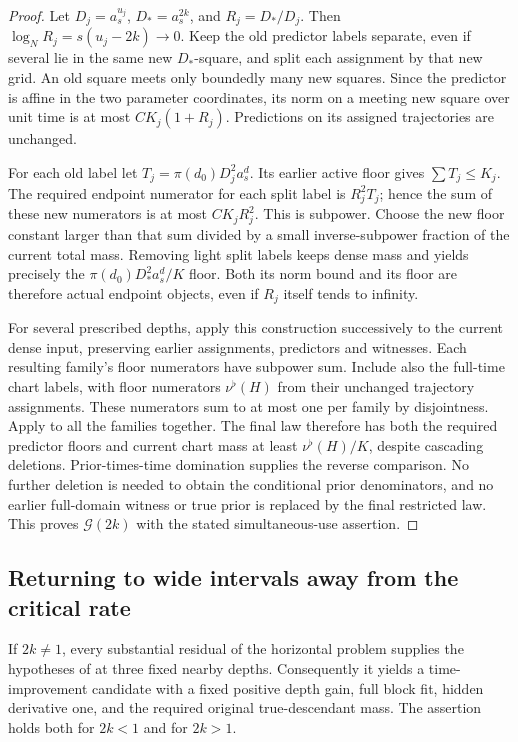 \begin{proof}
Let \(D_j=a_s^{u_j}\), \(D_*=a_s^{2k}\), and
\(R_j=D_*/D_j\).  Then
\(\log_N R_j=s(u_j-2k)\to0\).  Keep the old predictor labels
separate, even if several lie in the same new \(D_*\)-square,
and split each assignment by that new grid.  An old square meets
only boundedly many new squares.  Since the predictor is affine
in the two parameter coordinates, its norm on a meeting new square
over unit time is at most
\(C K_j(1+R_j)\).  Predictions on its assigned trajectories
are unchanged.

For each old label let
\(T_j=\pi(d_0)D_j^2a_s^d\).  Its earlier active floor gives
\(\sum T_j\le K_j\).  The required endpoint numerator for
each split label is \(R_j^2T_j\); hence the sum of these new
numerators is at most \(C K_jR_j^2\).  This is subpower.  Choose
the new floor constant larger than that sum divided by a small
inverse-subpower fraction of the current total mass.  Removing
light split labels keeps dense mass and yields precisely the
\(\pi(d_0)D_*^2a_s^d/K\) floor.  Both its norm bound and its
floor are therefore actual endpoint objects, even if \(R_j\)
itself tends to infinity.

For several prescribed depths, apply this construction successively
to the current dense input, preserving earlier assignments,
predictors and witnesses.  Each resulting family's floor
numerators have subpower sum.  Include also the full-time chart labels, with floor numerators
\(\nu^\flat(H)\) from their unchanged trajectory assignments.
These numerators sum to at most one per family by disjointness.
Apply  to all the families together.
The final law therefore has both the required predictor floors
and current chart mass at least \(\nu^\flat(H)/K\), despite
cascading deletions. Prior-times-time domination supplies the reverse
comparison. No further deletion is needed to obtain the conditional
prior denominators, and no earlier full-domain witness or true prior
is replaced by the final restricted law.  This proves \(\mathcal G(2k)\) with the stated
simultaneous-use assertion.
\end{proof}

\subsection{Returning to wide intervals away from the critical rate}

\begin{proposition}
\label{prop:offcritical-wide}
If \(2k\ne1\), every substantial residual of the horizontal
problem supplies the hypotheses of  at
three fixed nearby depths.  Consequently it yields a
time-improvement candidate with a fixed positive depth gain, full
block fit, hidden derivative one, and the required original
true-descendant mass.  The assertion holds both for \(2k<1\)
and for \(2k>1\).
\end{proposition}


